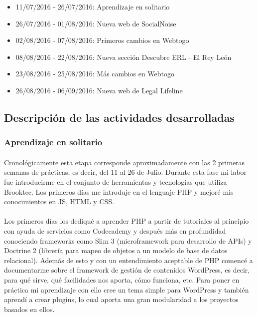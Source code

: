 \documentclass[10pt, a4paper,spanish]{article}
\begin{document}
            \begin{itemize}
                \item 11/07/2016 - 26/07/2016:  Aprendizaje en solitario
                \item 26/07/2016 - 01/08/2016:  Nueva web de SocialNoise
                \item 02/08/2016 - 07/08/2016:  Primeros cambios en Webtogo
                \item 08/08/2016 - 22/08/2016:  Nueva sección Descubre ERL - El Rey León
                \item 23/08/2016 - 25/08/2016:  Más cambios en Webtogo
                \item 26/08/2016 - 06/09/2016:  Nueva web de Legal Lifeline
            \end{itemize}

        \subsection{Descripción de las actividades desarrolladas}

            \subsubsection{Aprendizaje en solitario}

                \paragraph{}
                Cronológicamente esta etapa corresponde aproximadamente con las 2 primeras semanas de prácticas, es decir, del 11 al 26 de Julio. Durante esta fase mi labor fue introducirme en el conjunto de herramientas y tecnologías que utiliza Brooktec. Los primeros días me introduje en el lenguaje PHP y mejoré mis conocimientos en JS, HTML y CSS.

                \paragraph{}
                Los primeros días los dediqué a aprender PHP a partir de tutoriales al principio con ayuda de servicios como Codecademy y después más en profundidad conociendo frameworks como Slim 3 (microframework para desarrollo de APIs) y Doctrine 2 (librería para mapeo de objetos a un modelo de base de datos relacional). Además de esto y con un entendimiento aceptable de PHP comencé a documentarme sobre el framework de gestión de contenidos WordPress, es decir, para qué sirve, qué facilidades nos aporta, cómo funciona, etc. Para poner en práctica mi aprendizaje con ello cree un tema simple para WordPress y también aprendí a crear plugins, lo cual aporta una gran modularidad a los proyectos basados en ellos.
\end{document}
